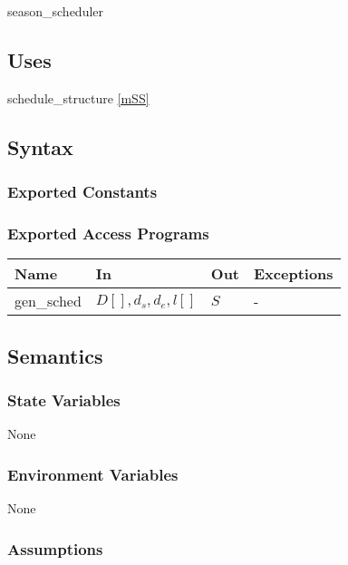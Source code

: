 \documentclass[12pt, titlepage]{article}
\begin{document}
season\_scheduler

\subsection{Uses}

schedule\_structure \ref{mSS}

\subsection{Syntax}

\subsubsection{Exported Constants}

\subsubsection{Exported Access Programs}

\begin{center}
\begin{tabular}{p{2cm} p{4cm} p{4cm} p{2cm}}
\hline
\textbf{Name} & \textbf{In} & \textbf{Out} & \textbf{Exceptions} \\
\hline
gen\_sched & $D[], d_s, d_e, l[]$ & $S$ & - \\
\hline
\end{tabular}
\end{center}

\subsection{Semantics}

\subsubsection{State Variables}

None

\subsubsection{Environment Variables}

None

\subsubsection{Assumptions}

\end{document}
